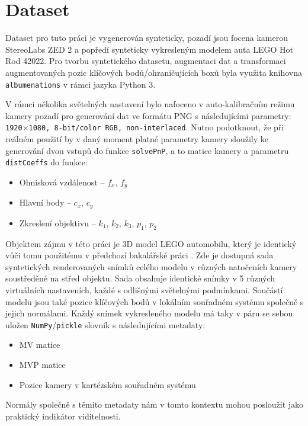 \chapter{Dataset}
\label{sec:Chapter3}
Dataset pro tuto práci je vygenerován synteticky, pozadí jsou focena kamerou StereoLabs ZED 2 a popředí synteticky vykresleným modelem auta LEGO Hot Rod 42022. Pro tvorbu syntetického datasetu, augmentaci dat a transformaci augmentovaných pozic klíčových bodů/ohraničujících boxů byla využita knihovna \texttt{albumenations} v rámci jazyka Python 3. 

V rámci několika světelných nastavení bylo nafoceno v auto-kalibračním režimu kamery pozadí pro generování dat ve formátu PNG s následujícími parametry: \texttt{1920$\times$1080, 8-bit/color RGB, non-interlaced}. Nutno podotknout, že při reálném použití by v daný moment platné parametry kamery sloužily ke generování dvou vstupů do funkce \texttt{solvePnP}, a to matice kamery a parametru \texttt{distCoeffs} do funkce:
\begin{itemize}
    \item Ohnisková vzdálenost -- $f_x$, $f_y$
    \item Hlavní body -- $c_x$, $c_y$
    \item Zkreslení objektivu -- $k_1$, $k_2$, $k_3$, $p_1$, $p_2$
\end{itemize}

Objektem zájmu v této práci je 3D model LEGO automobilu, který je identický vůči tomu použitému v předchozí bakalářské práci \cite{mojebp}. Zde je dostupná sada syntetických renderovaných snímků celého modelu v různých natočeních kamery soustředěné na střed objektu. Sada obsahuje identické snímky v 5 různých virtuálních nastaveních, každé s odlišnými světelnými podmínkami. Součástí modelu jsou také pozice klíčových bodů v lokálním souřadném systému společně s jejich normálami. Každý snímek vykresleného modelu má taky v páru se sebou uložen \texttt{NumPy}/\texttt{pickle} slovník s následujícími metadaty:
\begin{itemize}
    \item MV matice
    \item MVP matice
    \item Pozice kamery v kartézském souřadném systému
\end{itemize}
Normály společně s těmito metadaty nám v tomto kontextu mohou posloužit jako praktický indikátor viditelnosti.


